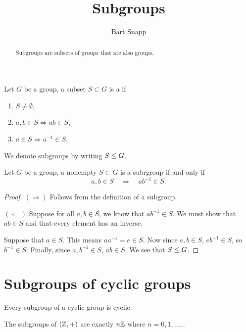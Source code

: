 \documentclass{ximera}
\author{Bart Snapp}
\title{Subgroups}
\begin{document}
\begin{abstract}
  Subgroups are subsets of groups that are also groups. 
\end{abstract}
\maketitle


\begin{definition}
  Let $G$ be a group, a subset $S\subset G$ is a  if
  \begin{enumerate}
  \item $S \ne \emptyset$,
  \item $a,b\in S \Rightarrow ab\in S$,
  \item $a\in S \Rightarrow a^{-1}\in S$.
  \end{enumerate}
  We denote subgroups by writing $S\leq G$.
\end{definition}



\begin{theorem}
  Let $G$ be a group, a nonempty $S\subset G$ is a subrgroup if and
  only if
  \[
  a,b\in S \quad \Rightarrow \quad ab^{-1}\in S.
  \]
  \begin{proof}
    $(\Rightarrow)$ Follows from the definition of a subgroup.

    $(\Leftarrow)$ Suppose for all $a,b\in S$, we know that
    $ab^{-1}\in S$. We must show that $ab\in S$ and that every element
    has an inverse.

    Suppose that $a\in S$. This means $aa^{-1} = e\in S$.  Now since
    $e,b\in S$, $eb^{-1}\in S$, so $b^{-1}\in S$.  Finally, since
    $a,b^{-1}\in S$, $ab\in S$. We see that $S\leq G$.
  \end{proof}
\end{theorem}



\section{Subgroups of cyclic groups}


\begin{theorem}
  Every subgroup of a cyclic group is cyclic.
\end{theorem}


\begin{corollary}
  The subgroups of $(\mathbb Z,+)$ are exactly $n\mathbb Z$ where $n = 0,1,\dots,$.
\end{corollary}
\end{document}
